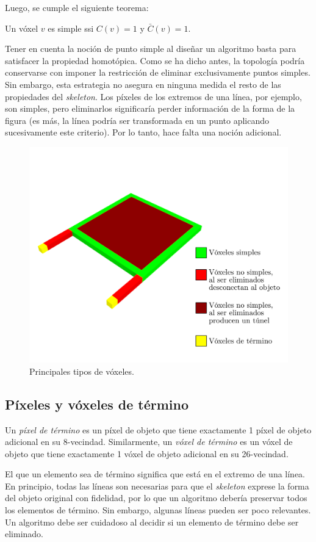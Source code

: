Luego, se cumple el siguiente teorema:
\begin{theorem}
Un vóxel $v$ es simple ssi $C(v) = 1$ y $\bar{C}(v) = 1$.
\end{theorem}

Tener en cuenta la noción de punto  simple al diseñar un algoritmo basta para satisfacer la propiedad homotópica. Como se ha dicho antes, la topología podría conservarse con imponer la restricción de eliminar exclusivamente puntos simples. Sin embargo, esta estrategia no asegura en ninguna medida el resto de las propiedades del \textit{skeleton}. Los píxeles de los extremos de una línea, por ejemplo, son simples, pero eliminarlos significaría perder información de la forma de la figura (es más, la línea podría ser transformada en un punto aplicando sucesivamente este criterio). Por lo tanto, hace falta una noción adicional.

\begin{figure}[ht]\centering
\includegraphics[width=0.7\linewidth]{images/voxel_types}
\caption{Principales tipos de vóxeles.}
\label{fig:voxeltypes}
\end{figure}

\subsection{Píxeles y vóxeles de término}

Un \textit{píxel de término} es un píxel de objeto que tiene exactamente 1 píxel de objeto adicional en su 8-vecindad. Similarmente, un \textit{vóxel de término} es un vóxel de objeto que tiene exactamente 1 vóxel de objeto adicional en su 26-vecindad.

El que un elemento sea de término significa que está en el extremo de una línea. En principio, todas las líneas son necesarias para que el \textit{skeleton} exprese la forma del objeto original con fidelidad, por lo que un algoritmo debería preservar todos los elementos de término. Sin embargo, algunas líneas pueden ser poco relevantes. Un algoritmo debe ser cuidadoso al decidir si un elemento de término debe ser eliminado.

